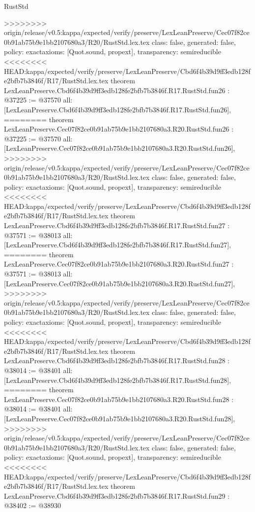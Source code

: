 \begin{lexlean}{RustStd}
\begin{coremodule}
{\begin{coremodule}
{{{{{{{{{{{{{{{{{{{{{{{{{{{{{>>>>>>>> origin/release/v0.5:kappa/expected/verify/preserve/LexLeanPreserve/Cec07f82ce0b91ab75b9e1bb2107680a3/R20/RustStd.lex.tex
  class: false,
  generated: false,
  policy: exact{axioms: [Quot.sound, propext]},
  transparency: semireducible
}
<<<<<<<< HEAD:kappa/expected/verify/preserve/LexLeanPreserve/Cbd6f4b39d9ff3edb128fe2bfb7b3846f/R17/RustStd.lex.tex
theorem LexLeanPreserve.Cbd6f4b39d9ff3edb128fe2bfb7b3846f.R17.RustStd.fun26 : @37225 := @37570 {
  all: [LexLeanPreserve.Cbd6f4b39d9ff3edb128fe2bfb7b3846f.R17.RustStd.fun26],
========
theorem LexLeanPreserve.Cec07f82ce0b91ab75b9e1bb2107680a3.R20.RustStd.fun26 : @37225 := @37570 {
  all: [LexLeanPreserve.Cec07f82ce0b91ab75b9e1bb2107680a3.R20.RustStd.fun26],
>>>>>>>> origin/release/v0.5:kappa/expected/verify/preserve/LexLeanPreserve/Cec07f82ce0b91ab75b9e1bb2107680a3/R20/RustStd.lex.tex
  class: false,
  generated: false,
  policy: exact{axioms: [Quot.sound, propext]},
  transparency: semireducible
}
<<<<<<<< HEAD:kappa/expected/verify/preserve/LexLeanPreserve/Cbd6f4b39d9ff3edb128fe2bfb7b3846f/R17/RustStd.lex.tex
theorem LexLeanPreserve.Cbd6f4b39d9ff3edb128fe2bfb7b3846f.R17.RustStd.fun27 : @37571 := @38013 {
  all: [LexLeanPreserve.Cbd6f4b39d9ff3edb128fe2bfb7b3846f.R17.RustStd.fun27],
========
theorem LexLeanPreserve.Cec07f82ce0b91ab75b9e1bb2107680a3.R20.RustStd.fun27 : @37571 := @38013 {
  all: [LexLeanPreserve.Cec07f82ce0b91ab75b9e1bb2107680a3.R20.RustStd.fun27],
>>>>>>>> origin/release/v0.5:kappa/expected/verify/preserve/LexLeanPreserve/Cec07f82ce0b91ab75b9e1bb2107680a3/R20/RustStd.lex.tex
  class: false,
  generated: false,
  policy: exact{axioms: [Quot.sound, propext]},
  transparency: semireducible
}
<<<<<<<< HEAD:kappa/expected/verify/preserve/LexLeanPreserve/Cbd6f4b39d9ff3edb128fe2bfb7b3846f/R17/RustStd.lex.tex
theorem LexLeanPreserve.Cbd6f4b39d9ff3edb128fe2bfb7b3846f.R17.RustStd.fun28 : @38014 := @38401 {
  all: [LexLeanPreserve.Cbd6f4b39d9ff3edb128fe2bfb7b3846f.R17.RustStd.fun28],
========
theorem LexLeanPreserve.Cec07f82ce0b91ab75b9e1bb2107680a3.R20.RustStd.fun28 : @38014 := @38401 {
  all: [LexLeanPreserve.Cec07f82ce0b91ab75b9e1bb2107680a3.R20.RustStd.fun28],
>>>>>>>> origin/release/v0.5:kappa/expected/verify/preserve/LexLeanPreserve/Cec07f82ce0b91ab75b9e1bb2107680a3/R20/RustStd.lex.tex
  class: false,
  generated: false,
  policy: exact{axioms: [Quot.sound, propext]},
  transparency: semireducible
}
<<<<<<<< HEAD:kappa/expected/verify/preserve/LexLeanPreserve/Cbd6f4b39d9ff3edb128fe2bfb7b3846f/R17/RustStd.lex.tex
theorem LexLeanPreserve.Cbd6f4b39d9ff3edb128fe2bfb7b3846f.R17.RustStd.fun29 : @38402 := @38930 {
}}}}}}}}}}}}}}}}}}}}}}}}}}}}}}}}
\end{coremodule}}
\end{coremodule}
\end{lexlean}
